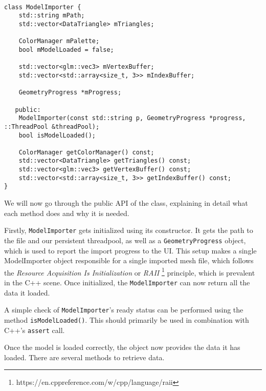 \begin{lstlisting}

class ModelImporter {
    std::string mPath;
    std::vector<DataTriangle> mTriangles;

    ColorManager mPalette;
    bool mModelLoaded = false;

    std::vector<glm::vec3> mVertexBuffer;
    std::vector<std::array<size_t, 3>> mIndexBuffer;

    GeometryProgress *mProgress;

   public:
    ModelImporter(const std::string p, GeometryProgress *progress, ::ThreadPool &threadPool);
    bool isModelLoaded();

    ColorManager getColorManager() const;
    std::vector<DataTriangle> getTriangles() const;
    std::vector<glm::vec3> getVertexBuffer() const;
    std::vector<std::array<size_t, 3>> getIndexBuffer() const;
}

\end{lstlisting}

We will now go through the public API of the class, explaining in detail what each method does and why it is needed.

Firstly, \texttt{ModelImporter} gets initialized using its constructor. It gets the path to the file and our persistent threadpool, as well as a \texttt{GeometryProgress} object, which is used to report the import progress to the UI. This setup makes a single ModelImporter object responsible for a single imported mesh file, which follows the \textit{Resource Acquisition Is Initialization} or \textit{RAII} \footnote{https://en.cppreference.com/w/cpp/language/raii} principle, which is prevalent in the C++ scene. Once initialized, the \texttt{ModelImporter} can now return all the data it loaded.

A simple check of \texttt{ModelImporter}'s ready status can be performed using the method \texttt{isModelLoaded()}. This should primarily be used in combination with C++'s \texttt{assert} call.

Once the model is loaded correctly, the object now provides the data it has loaded. There are several methods to retrieve data.

